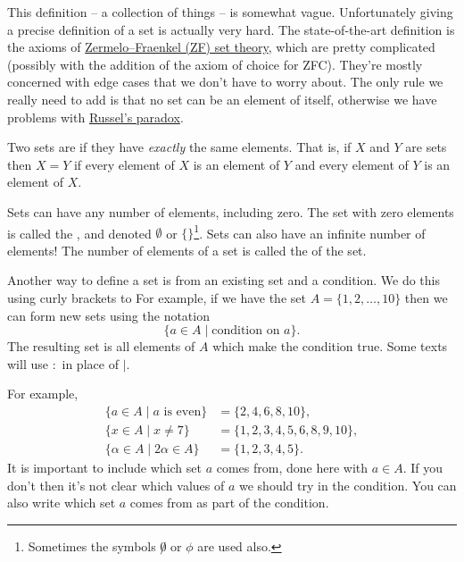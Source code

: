 \documentclass[fleqn]{LectureClass/LectureClass}
\begin{document}
    \begin{remark}{}{}
        This definition -- a collection of things -- is somewhat vague.
        Unfortunately giving a precise definition of a set is actually very hard.
        The state-of-the-art definition is the axioms of \href{https://en.wikipedia.org/wiki/Zermelo%E2%80%93Fraenkel_set_theory}{Zermelo--Fraenkel (ZF) set theory}, which are pretty complicated (possibly with the addition of the axiom of choice for ZFC).
        They're mostly concerned with edge cases that we don't have to worry about.
        The only rule we really need to add is that no set can be an element of itself, otherwise we have problems with \href{https://en.wikipedia.org/wiki/Russell%27s_paradox}{Russel's paradox}.
    \end{remark}
    
    Two sets are  if they have \emph{exactly} the same elements.
    That is, if \(X\) and \(Y\) are sets then \(X = Y\) if every element of \(X\) is an element of \(Y\) and every element of \(Y\) is an element of \(X\).
    
    Sets can have any number of elements, including zero.
    The set with zero elements is called the , and denoted \(\emptyset\) or \(\{\}\)\footnote{Sometimes the symbols \(\not0\) or \(\phi\) are used also.}.
    Sets can also have an infinite number of elements!
    The number of elements of a set is called the  of the set.
    
    Another way to define a set is from an existing set and a condition.
    We do this using curly brackets to 
    For example, if we have the set \(A = \{1, 2, \dotsc, 10\}\) then we can form new sets using the notation
    \begin{equation}
        \{a \in A \mid \text{condition on } a\}.
    \end{equation}
    The resulting set is all elements of \(A\) which make the condition true.
    Some texts will use \(:\) in place of \(\mid\).
    
    For example,
    \begin{align}
        \{a \in A \mid a \text{ is even}\} &= \{2, 4, 6, 8, 10\},\\
        \{x \in A \mid x \ne 7\} &= \{1, 2, 3, 4, 5, 6, 8, 9, 10\},\\
        \{\alpha \in A \mid 2\alpha \in A\} &= \{1, 2, 3, 4, 5\}.
    \end{align}
    It is important to include which set \(a\) comes from, done here with \(a \in A\).
    If you don't then it's not clear which values of \(a\) we should try in the condition.
    You can also write which set \(a\) comes from as part of the condition.
    
\end{document}
